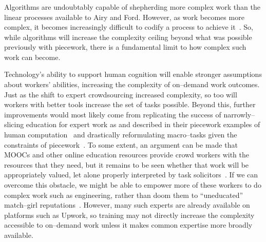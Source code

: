 \documentclass[trackingWork]{subfiles}
\begin{document}

\subsubsection{\implication}
Algorithms are undoubtably capable of shepherding more complex work than the linear processes available to Airy and Ford.
However, as work becomes more complex, it becomes increasingly difficult to codify a process to achieve it~\cite{Faraj2006a,edmondson2012teaming}.
So, while algorithms will increase the complexity ceiling beyond what was possible previously with piecework, there is a fundamental limit to how complex such work can become.

Technology's ability to support human cognition will enable stronger assumptions about workers' abilities, increasing the complexity of on--demand work outcomes.
Just as the shift to expert crowdsourcing increased complexity, so too will workers with better tools increase the set of tasks possible.
Beyond this, further improvements would most likely come from replicating the success of narrowly--slicing education for expert work as \citeauthor{hart2013rise} and \citeauthor{grier2013computers} described in their piecework examples
of human computation~\cite{grier2013computers} and drastically reformulating macro--tasks given the constraints of piecework~\cite{hart2013rise}.
To some extent, an argument can be made that
MOOCs and other online education resources
provide crowd workers with the resources that they need, but 
it remains to be seen whether that work will be appropriately valued, let alone
properly interpreted by task solicitors~\cite{aguaded2013mooc}.
If we can overcome this obstacle,
we might be able to empower more of these workers to do complex work such as engineering,
rather than doom them to ``uneducated'' match--girl reputations~\cite{10.2307/3827491}.
However, many such experts are already available on platforms such as Upwork, so training may not directly increase the complexity accessible to on--demand work unless it makes common expertise more broadly available.
\end{document}
